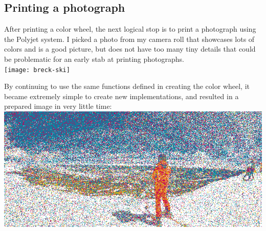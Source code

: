 \documentclass{article}
\begin{document}
\begin{multicols}{2}
\subsection{Printing a photograph}

After printing a color wheel, the next logical stop is to print a photograph using the Polyjet system. I picked a photo from my camera roll that showcases lots of colors and is a good picture, but does not have too many tiny details that could be problematic for an early stab at printing photographs.
\\

\noindent
\texttt{[image: breck-ski]}
\

\noindent
By continuing to use the same functions defined in creating the color wheel, it became extremely simple to create new implementations, and resulted in a prepared image in very little time:
\\

\noindent
\noindent
\includegraphics[width=\columnwidth]{breck-ski-600}


\end{multicols}
\end{document}
